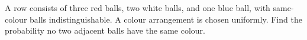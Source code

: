 A row consists of three red balls, two white balls, and one blue ball, with same-colour balls indistinguishable. A colour arrangement is chosen uniformly. Find the probability no two adjacent balls have the same colour.
